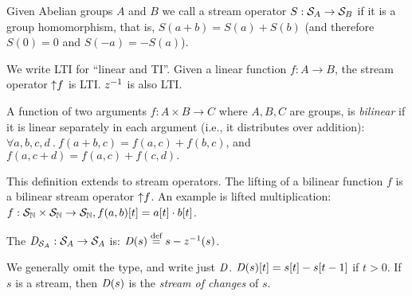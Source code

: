 \begin{definition}[linear]
Given Abelian groups $A$ and $B$ we call a stream operator
$S: \mathcal{S}_{A} \rightarrow \mathcal{S}_{B}$  if it is a group homomorphism, that is,
$S(a+b)=S(a)+S(b)$ (and therefore $S(0)=0$ and $S(-a)=-S(a)$).
\end{definition}

We write LTI for ``linear and TI''.  Given a linear function $f: A \to
B$, the stream operator ${\uparrow}f$ is LTI.  $z^{-1}$ is also LTI.

\begin{definition}[bilinear]
A function of two arguments $f: A \times B \to C$ where $A, B, C$ are
groups, is \emph{bilinear} if it is linear separately in each argument
(i.e., it distributes over addition): $\forall a, b, c, d~.~f(a+b, c)
= f(a, c) + f(b, c)$, and $f(a, c+d) = f(a, c) + f(c, d).$
\end{definition}

This definition extends to stream operators.
The lifting of a bilinear function $f$ is
a bilinear stream operator ${\uparrow}f$.  An example
is lifted multiplication:
$f: \mathcal{S}_{\mathbb{N}} \times \mathcal{S}_{\mathbb{N}} \to \mathcal{S}_{\mathbb{N}}, f(a, b)[t] = a[t]\cdot b[t]$.


\begin{definition}[differentiation]
The  $\mathit{D}_{\mathcal{S}_{A}} : \mathcal{S}_{A}
\to \mathcal{S}_{A}$ is: $\mathit{D}(s) \stackrel{\textrm{\scriptsize def}}{=} s - z^{-1}(s)$.
\begin{center}
\end{center}
\end{definition}
We generally omit the type, and write just $\mathit{D}$.  $\mathit{D}(s)[t] = s[t] -
s[t-1]$ if $t > 0$.  If $s$ is a stream, then $\mathit{D}(s)$ is the
\emph{stream of changes} of $s$.

